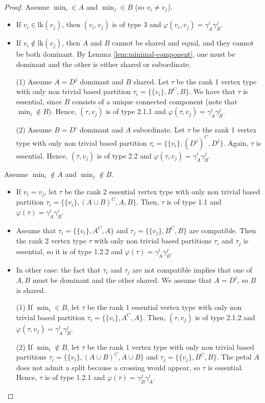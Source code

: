 \documentclass[a4paper]{amsart}
\newcommand{\lk}{\mathrm{lk}}
\theoremstyle{definition}
\theoremstyle{remark}
\begin{document}
\begin{proof}
 Assume $\min_i\in A$ and $\min_j\in B$ (so $v_i\neq v_j$).
\begin{itemize}
    \item If $v_i\in\lk(v_j)$, then $(v_i,v_j)$ is of type 3 and $\varphi(v_i,v_j)=\gamma^i_{A}\gamma^j_{B}$.
    \item If $v_i\notin\lk(v_j)$, then $A$ and $B$ cannot be shared and equal, and they cannot be both dominant. By Lemma \ref{lem:minimal-component}, one must be dominant and the other is either shared or subordinate.

    (1) Assume $A=D^j$ dominant and $B$ shared. Let $\tau$ be the rank 1 vertex type with only non trivial based partition  $\tau_i=\{\{v_i\}, B^C, B\}$. We have that $\tau$ is essential, since $B$ consists of a unique connected component (note that $\min_i\notin B$). Hence, $(\tau,v_j)$ is of type 2.1.1 and $\varphi(\tau,v_j)=\gamma^i_{A}\gamma^j_{B}$.

    (2) Assume $B=D^i$ dominant and $A$ subordinate. Let $\tau$ be the rank 1 vertex type with only non trivial based partition  $\tau_i=\{\{v_i\}, (D^j)^C, D^j\}$. Again, $\tau$ is essential. Hence, $(\tau,v_j)$ is of type 2.2 and $\varphi(\tau,v_j)=\gamma^i_{A}\gamma^j_{B}$.
\end{itemize}

 Assume $\min_i\notin A$ and $\min_j\notin B$.
\begin{itemize}
    \item If $v_i=v_j$, let  $\tau$ be the rank 2 essential vertex type with only non trivial based partition  $\tau_i=\{\{v_i\}, (A\cup B)^C, A, B\}$. Then, $\tau$ is of type 1.1 and $\varphi(\tau)=\gamma^i_{A}\gamma^i_{B}$.
    \item Assume that  $\tau_i=\{\{v_i\}, A^C, A\}$ and $\tau_j=\{\{v_j\}, B^C, B\}$ are compatible. Then the rank 2 vertex type $\tau$ with only non trivial based partitions  $\tau_i$ and $\tau_j$ is essential, so it is of type 1.2.2 and $\varphi(\tau)=\gamma^i_{A}\gamma^j_{B}$.
    \item In other case: the fact that $\tau_i$ and $\tau_j$ are not compatible implies that one of $A,B$  must be  dominant and the other shared. We assume that $A=D^j$, so $B$ is shared.

    (1) If  $\min_i\in B$, let $\tau$ be the rank 1 essential vertex type with only non trivial based partition  $\tau_i=\{\{v_i\}, A^C, A\}$. Then, $(\tau,v_j)$ is of type 2.1.2 and $\varphi(\tau,v_j)=\gamma^i_{A}\gamma^j_{B}$.

    

    (2) If  $\min_i\notin B$, let $\tau$ be the rank 1 vertex type with only non trivial based partitions $\tau_i=\{\{v_i\}, (A\cup B)^C, A\cup B\}$ and $\tau_j=\{\{v_j\}, B^C,  B\}$. The petal $A$  does not admit a split because a crossing would appear, so $\tau$ is essential. Hence, $\tau$ is of type 1.2.1 and $\varphi(\tau)=\gamma^j_{B}\gamma^i_{A}$.

\end{itemize}







\end{proof}
\end{document}
